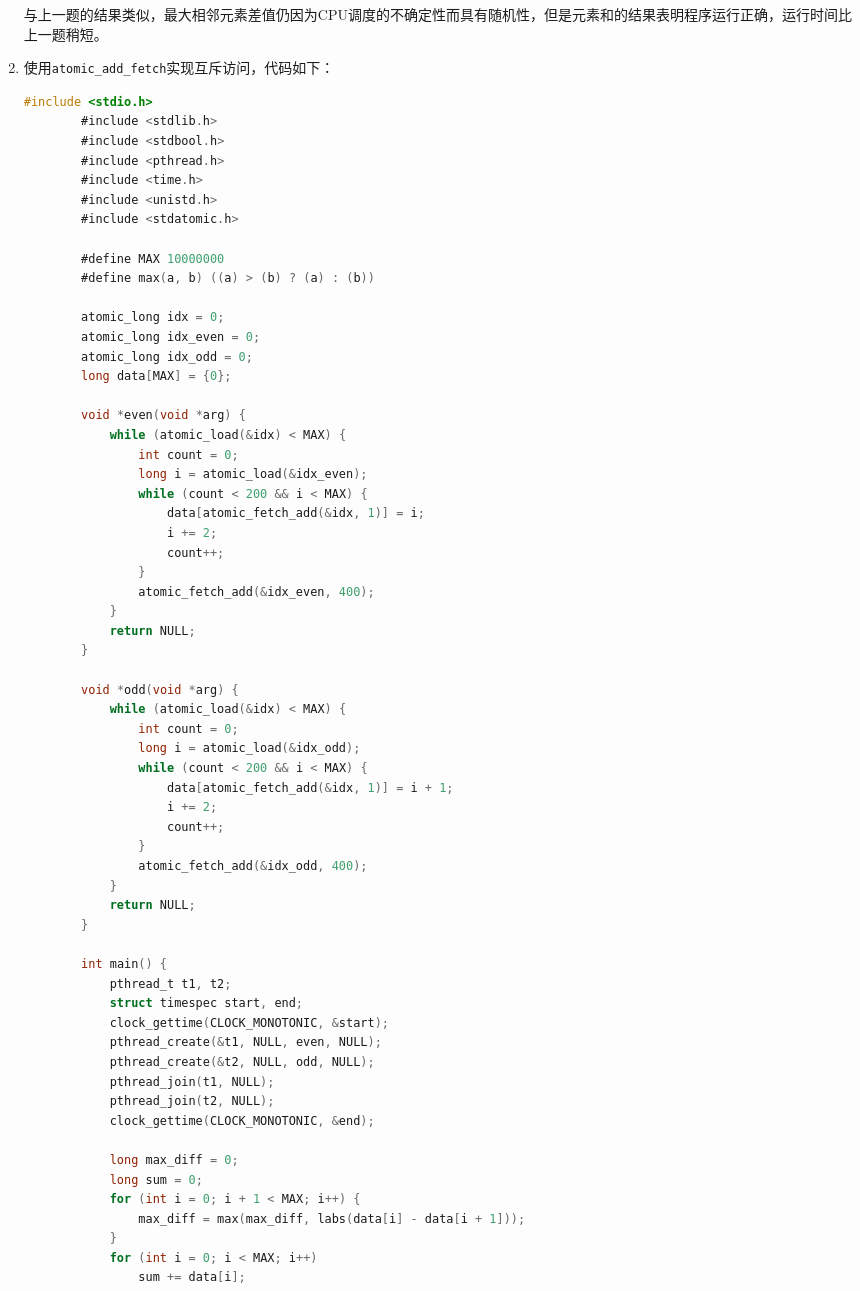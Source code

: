 \documentclass[UTF8]{report}
\begin{document}
\begin{enumerate}[label=(\arabic*)]
    与上一题的结果类似，最大相邻元素差值仍因为CPU调度的不确定性而具有随机性，但是元素和的结果表明程序运行正确，运行时间比上一题稍短。

    \item 使用\texttt{atomic_add_fetch}实现互斥访问，代码如下：
    
    \begin{lstlisting}[language=C]
        #include <stdio.h>
        #include <stdlib.h>
        #include <stdbool.h>
        #include <pthread.h>
        #include <time.h>
        #include <unistd.h>
        #include <stdatomic.h>
        
        #define MAX 10000000
        #define max(a, b) ((a) > (b) ? (a) : (b))
        
        atomic_long idx = 0;
        atomic_long idx_even = 0;
        atomic_long idx_odd = 0;
        long data[MAX] = {0};
        
        void *even(void *arg) {
            while (atomic_load(&idx) < MAX) {
                int count = 0;
                long i = atomic_load(&idx_even);
                while (count < 200 && i < MAX) {
                    data[atomic_fetch_add(&idx, 1)] = i;
                    i += 2;
                    count++;
                }
                atomic_fetch_add(&idx_even, 400);
            }
            return NULL;
        }
        
        void *odd(void *arg) {
            while (atomic_load(&idx) < MAX) {
                int count = 0;
                long i = atomic_load(&idx_odd);
                while (count < 200 && i < MAX) {
                    data[atomic_fetch_add(&idx, 1)] = i + 1;
                    i += 2;
                    count++;
                }
                atomic_fetch_add(&idx_odd, 400);
            }
            return NULL;
        }
        
        int main() {
            pthread_t t1, t2;
            struct timespec start, end;
            clock_gettime(CLOCK_MONOTONIC, &start);
            pthread_create(&t1, NULL, even, NULL);
            pthread_create(&t2, NULL, odd, NULL);
            pthread_join(t1, NULL);
            pthread_join(t2, NULL);
            clock_gettime(CLOCK_MONOTONIC, &end);
        
            long max_diff = 0;
            long sum = 0;
            for (int i = 0; i + 1 < MAX; i++) {
                max_diff = max(max_diff, labs(data[i] - data[i + 1]));
            }
            for (int i = 0; i < MAX; i++)
                sum += data[i];
        

\end{lstlisting}
\end{enumerate}
\end{document}
